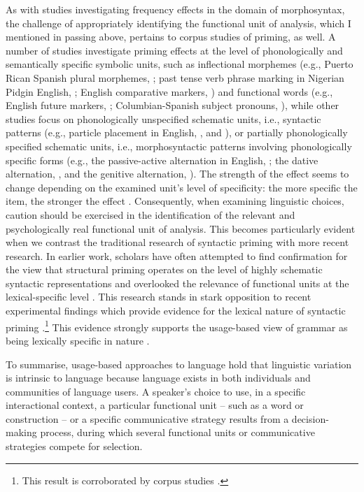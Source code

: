 As with studies investigating frequency effects in the domain of morphosyntax, the challenge of appropriately identifying the functional unit of analysis, which I mentioned in passing above, pertains to corpus studies of priming, as well. A number of studies investigate priming effects at the level of phonologically and semantically specific symbolic units, such as inflectional morphemes (e.g., Puerto Rican Spanish plural morphemes, \citealt{poplack-deletion80}; past tense verb phrase marking in Nigerian Pidgin English, \citealt{poplack-tagliamonte}; English comparative markers, \citealt{szmrecsanyi2006}) and functional words (e.g., English future markers, \citealt{szmrecsanyi2006}; Columbian-Spanish subject pronouns, \citealt{travis2005}), while other studies focus on  phonologically unspecified schematic units, i.e., syntactic patterns (e.g., particle placement in English, \citealt{gries2005}, and \citealt{szmrecsanyi2006}), or partially phonologically specified schematic units, i.e., morphosyntactic patterns involving phonologically specific forms (e.g., the passive-active alternation in English, \citealt{weiner-labov}; the dative alternation, \citealt{gries2005}, and the genitive alternation, \citealt{szmrecsanyi2006}). The strength of the effect seems to change depending on the examined unit's level of specificity: the more specific the item, the stronger the effect \citep[181--182]{szmrecsanyi2006}. Consequently, when examining linguistic choices, caution should be exercised in the identification of the relevant and psychologically real functional unit of analysis. This becomes particularly evident when we contrast the traditional research of syntactic priming with more recent research. In earlier work, scholars have often attempted to find confirmation for the view that structural priming operates on the level of highly schematic syntactic representations and overlooked the relevance of functional units at the lexical-specific level \citep{bock1986,szmrecsanyi2006}. This research stands in stark opposition to recent experimental findings which provide evidence for the lexical nature of syntactic priming \citep{pickering-branigan98,pickering-branigan1999,melinger-dobel2005}.\footnote{This result is corroborated by corpus studies \citep{gries2005}.} This evidence strongly supports the usage-based view of grammar as being lexically specific in nature \citep{lieven-pine-baldwin-1997,goldberg-2003,tomasello-constructing-2003,bybee-book-2010,diessel-review}.

To summarise, usage-based approaches to language hold that linguistic variation is intrinsic to language because language exists in both individuals and communities of language users. A speaker's choice to use, in a specific interactional context,  a particular functional unit -- such as a word or construction -- or a specific communicative strategy results from a decision-making process, during which several functional units or communicative strategies compete for selection.

